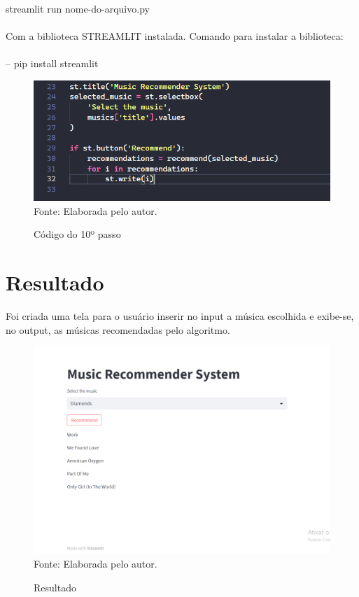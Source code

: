 \documentclass[a4paper, 12pt]{article}
\begin{document}
streamlit run nome-do-arquivo.py
\\\\
Com a biblioteca STREAMLIT instalada. Comando para instalar a biblioteca:
\\\\
-- pip install streamlit
 \begin{figure}[!ht]
        \centering
        \caption{Código do 10º passo}
        \includegraphics[scale=0.5]{10passo.png} \\
        {\footnotesize Fonte: Elaborada pelo autor.}
        \label{fig:my_label}
    \end{figure}
    
\newpage

\section{Resultado}
Foi criada uma tela para o usuário inserir no input a música escolhida e exibe-se, no output, as músicas recomendadas pelo algoritmo.
\begin{figure}[!ht]
        \centering
        \caption{Resultado}
        \includegraphics[scale=0.5]{resultado.png} \\
        {\footnotesize Fonte: Elaborada pelo autor.}
        \label{fig:my_label}
    \end{figure}
\end{document}
